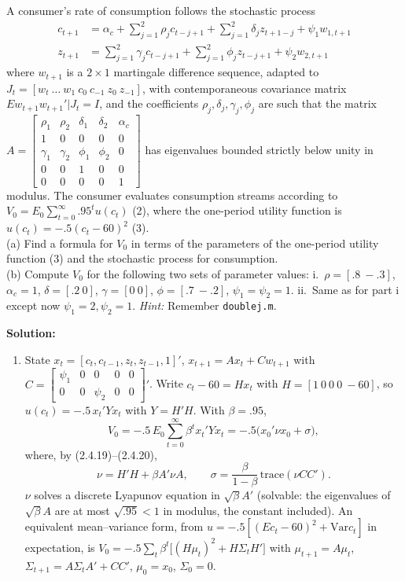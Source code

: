 \documentclass[12pt, letterpaper]{article}
\newcommand{\Var}{\mathrm{Var}}
\newcommand{\tr}{\mathrm{trace}}
\begin{document}
\begin{tcolorbox}[oddbox,title={Exercise 2.5 \quad Value of a Consumption Process}]
\begin{tcolorbox}[questionbox]
A consumer's rate of consumption follows the stochastic process
\[
\begin{aligned}
c_{t+1}&=\alpha_c+\sum_{j=1}^2\rho_jc_{t-j+1}+\sum_{j=1}^2\delta_jz_{t+1-j}+\psi_1w_{1,t+1}\\
z_{t+1}&=\sum_{j=1}^2\gamma_jc_{t-j+1}+\sum_{j=1}^2\phi_jz_{t-j+1}+\psi_2w_{2,t+1}
\end{aligned}\tag{1}
\]
where $w_{t+1}$ is a $2\times1$ martingale difference sequence, adapted to
$J_t=[w_t\ \dots\ w_1\ c_0\ c_{-1}\ z_0\ z_{-1}]$, with contemporaneous covariance matrix
$Ew_{t+1}w_{t+1}'|J_t=I$, and the coefficients $\rho_j,\delta_j,\gamma_j,\phi_j$ are such that the matrix
$A=\begin{bmatrix}\rho_1&\rho_2&\delta_1&\delta_2&\alpha_c\\1&0&0&0&0\\\gamma_1&\gamma_2&\phi_1&\phi_2&0\\0&0&1&0&0\\0&0&0&0&1\end{bmatrix}$
has eigenvalues bounded strictly below unity in modulus. The consumer evaluates consumption streams
according to $V_0=E_0\sum_{t=0}^\infty.95^tu(c_t)$ (2), where the one-period utility function is
$u(c_t)=-.5(c_t-60)^2$ (3).\\[3pt]
(a) Find a formula for $V_0$ in terms of the parameters of the one-period utility function (3) and
the stochastic process for consumption.\\
(b) Compute $V_0$ for the following two sets of parameter values:
i.\ $\rho=[.8\ -.3]$, $\alpha_c=1$, $\delta=[.2\ 0]$, $\gamma=[0\ 0]$, $\phi=[.7\ -.2]$, $\psi_1=\psi_2=1$.
ii.\ Same as for part i except now $\psi_1=2,\psi_2=1$. \textit{Hint:} Remember \texttt{doublej.m}.
\end{tcolorbox}

\textbf{Solution:}

\begin{enumerate}
\item State $x_t=[c_t,c_{t-1},z_t,z_{t-1},1]'$, $x_{t+1}=Ax_t+Cw_{t+1}$ with
$C=\begin{bmatrix}\psi_1&0&0&0&0\\0&0&\psi_2&0&0\end{bmatrix}'$. Write
$c_t-60=Hx_t$ with $H=[1\ 0\ 0\ 0\ -60]$, so $u(c_t)=-.5\,x_t'Yx_t$ with $Y=H'H$. With $\beta=.95$,
\[
V_0=-.5\,E_0\sum_{t=0}^\infty\beta^tx_t'Yx_t=-.5\big(x_0'\nu x_0+\sigma\big),
\]
where, by (2.4.19)--(2.4.20),
\[
\boxed{\nu=H'H+\beta A'\nu A,\qquad \sigma=\frac{\beta}{1-\beta}\,\tr(\nu CC').}
\]
$\nu$ solves a discrete Lyapunov equation in $\sqrt\beta A'$ (solvable: the eigenvalues of
$\sqrt\beta A$ are at most $\sqrt{.95}<1$ in modulus, the constant included). An equivalent
mean--variance form, from $u=-.5[(Ec_t-60)^2+\Var c_t]$ in expectation, is
$V_0=-.5\sum_t\beta^t\big[(H\mu_t)^2+H\Sigma_tH'\big]$ with $\mu_{t+1}=A\mu_t$,
$\Sigma_{t+1}=A\Sigma_tA'+CC'$, $\mu_0=x_0$, $\Sigma_0=0$.


\end{enumerate}
\end{tcolorbox}
\end{document}
